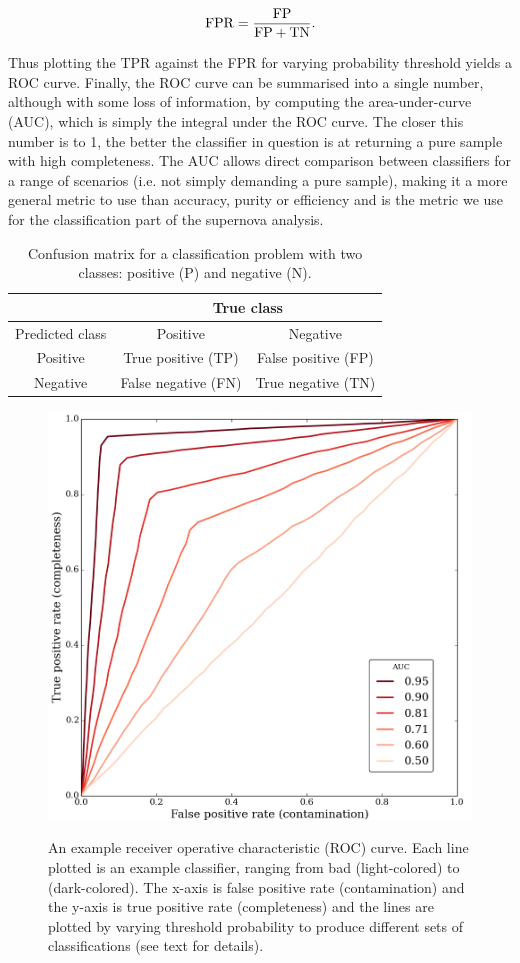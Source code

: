 \begin{equation}
 \rm{FPR} = \frac{\rm{FP}}{\rm{FP}+\rm{TN}}.
\end{equation}

Thus plotting the TPR against the FPR for varying probability threshold yields a ROC curve. 
Finally, the ROC curve can be summarised into a single number, although with some loss of 
information, by computing the area-under-curve (AUC), which is simply the integral under the ROC 
curve. The closer this number is to 1, the better the classifier in question is at returning a 
pure sample with high completeness. The AUC allows direct comparison between classifiers for a 
range of scenarios (i.e. not simply demanding a pure sample), making it a more general metric to 
use than accuracy, purity or efficiency and is the metric we use for the classification part of the 
supernova analysis.

\begin{table}
\centering
 \begin{tabular}{|c|c|c|}
 \hline
  & \multicolumn{2}{|c|}{True class}\\
  \hline
  Predicted class & Positive & Negative\\
  \hline
  Positive & True positive (TP) & False positive (FP)\\ 
  \hline
  Negative & False negative (FN) & True negative (TN)\\
  \hline
 \end{tabular}

 \label{table:confusion}
 \caption{Confusion matrix for a classification problem with two classes: positive (P) and negative 
(N).}
\end{table}


\begin{figure}
 \centering
 \includegraphics[width=0.7\hsize]{figs/supernova/roc_illustration}
 \label{fig:roc}
 \caption{An example receiver operative characteristic (ROC) curve. Each line plotted is an example 
classifier, ranging from bad (light-colored) to (dark-colored). The x-axis is false positive rate 
(contamination) and the y-axis is true positive rate (completeness) and the lines are plotted by 
varying threshold probability to produce different sets of classifications (see text for details).}
\end{figure}

